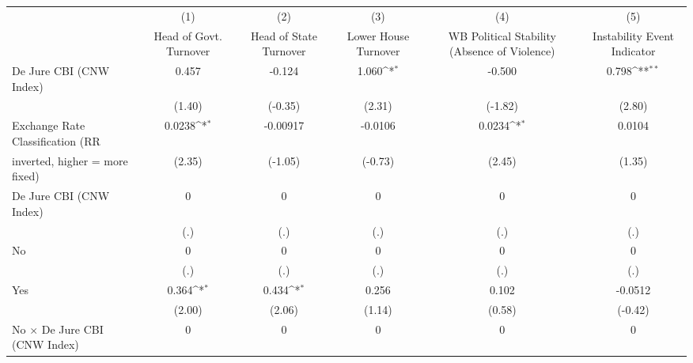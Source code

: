 {
\def\sym#1{\ifmmode^{#1}\else\(^{#1}\)\fi}
\begin{tabular}{l*{5}{c}}
\toprule
                                        &\multicolumn{1}{c}{(1)}&\multicolumn{1}{c}{(2)}&\multicolumn{1}{c}{(3)}&\multicolumn{1}{c}{(4)}&\multicolumn{1}{c}{(5)}\\
                                        &\multicolumn{1}{c}{Head of Govt. Turnover}&\multicolumn{1}{c}{Head of State Turnover}&\multicolumn{1}{c}{Lower House Turnover}&\multicolumn{1}{c}{WB Political Stability (Absence of Violence)}&\multicolumn{1}{c}{Instability Event Indicator}\\
\midrule
De Jure CBI (CNW Index)                 &     0.457         &    -0.124         &     1.060\sym{*}  &    -0.500         &     0.798\sym{**} \\
                                        &    (1.40)         &   (-0.35)         &    (2.31)         &   (-1.82)         &    (2.80)         \\
\addlinespace
Exchange Rate Classification (RR        &    0.0238\sym{*}  &  -0.00917         &   -0.0106         &    0.0234\sym{*}  &    0.0104         \\
inverted, higher = more fixed)          &    (2.35)         &   (-1.05)         &   (-0.73)         &    (2.45)         &    (1.35)         \\
\addlinespace
De Jure CBI (CNW Index)                 &         0         &         0         &         0         &         0         &         0         \\
                                        &       (.)         &       (.)         &       (.)         &       (.)         &       (.)         \\
\addlinespace
No                                      &         0         &         0         &         0         &         0         &         0         \\
                                        &       (.)         &       (.)         &       (.)         &       (.)         &       (.)         \\
\addlinespace
Yes                                     &     0.364\sym{*}  &     0.434\sym{*}  &     0.256         &     0.102         &   -0.0512         \\
                                        &    (2.00)         &    (2.06)         &    (1.14)         &    (0.58)         &   (-0.42)         \\
\addlinespace
No $\times$ De Jure CBI (CNW Index)     &         0         &         0         &         0         &         0         &         0         \\

\end{tabular}}
